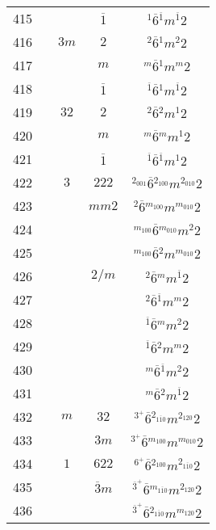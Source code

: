 \begin{longtable}{ccccc}
  415 &  &  & $\overline{1}$ & ${}^{1} \overline{6} {}^{\overline{1}} m {}^{\overline{1}} 2 $\\
  416 &  & $3m$ & $2$ & ${}^{2} \overline{6} {}^{1} m {}^{2} 2 $\\
  417 &  &  & $m$ & ${}^{m} \overline{6} {}^{1} m {}^{m} 2 $\\
  418 &  &  & $\overline{1}$ & ${}^{\overline{1}} \overline{6} {}^{1} m {}^{\overline{1}} 2 $\\
  419 &  & $32$ & $2$ & ${}^{2} \overline{6} {}^{2} m {}^{1} 2 $\\
  420 &  &  & $m$ & ${}^{m} \overline{6} {}^{m} m {}^{1} 2 $\\
  421 &  &  & $\overline{1}$ & ${}^{\overline{1}} \overline{6} {}^{\overline{1}} m {}^{1} 2 $\\
  422 &  & $3$ & $222$ & ${}^{2_{001}} \overline{6} {}^{2_{100}} m {}^{2_{010}} 2 $\\
  423 &  &  & $mm2$ & ${}^{2} \overline{6} {}^{m_{100}} m {}^{m_{010}} 2 $\\
  424 &  &  &  & ${}^{m_{100}} \overline{6} {}^{m_{010}} m {}^{2} 2 $\\
  425 &  &  &  & ${}^{m_{100}} \overline{6} {}^{2} m {}^{m_{010}} 2 $\\
  426 &  &  & $2/m$ & ${}^{2} \overline{6} {}^{m} m {}^{\overline{1}} 2 $\\
  427 &  &  &  & ${}^{2} \overline{6} {}^{\overline{1}} m {}^{m} 2 $\\
  428 &  &  &  & ${}^{\overline{1}} \overline{6} {}^{m} m {}^{2} 2 $\\
  429 &  &  &  & ${}^{\overline{1}} \overline{6} {}^{2} m {}^{m} 2 $\\
  430 &  &  &  & ${}^{m} \overline{6} {}^{\overline{1}} m {}^{2} 2 $\\
  431 &  &  &  & ${}^{m} \overline{6} {}^{2} m {}^{\overline{1}} 2 $\\
  432 &  & $m$ & $32$ & ${}^{3^{+}} \overline{6} {}^{2_{1\overline{1}0}} m {}^{2_{120}} 2 $\\
  433 &  &  & $3m$ & ${}^{3^{+}} \overline{6} {}^{m_{100}} m {}^{m_{010}} 2 $\\
  434 &  & $1$ & $622$ & ${}^{6^{+}} \overline{6} {}^{2_{100}} m {}^{2_{1\overline{1}0}} 2 $\\
  435 &  &  & $\overline{3}m$ & ${}^{\overline{3}^{+}} \overline{6} {}^{m_{1\overline{1}0}} m {}^{2_{120}} 2 $\\
  436 &  &  &  & ${}^{\overline{3}^{+}} \overline{6} {}^{2_{1\overline{1}0}} m {}^{m_{120}} 2 $\\

\end{longtable}
